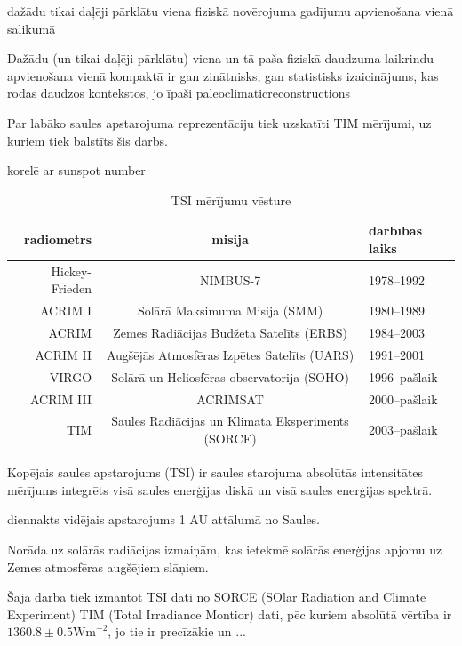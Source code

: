 dažādu tikai daļēji pārklātu viena fiziskā novērojuma 
gadījumu apvienošana vienā salikumā


Dažādu (un tikai daļēji pārklātu) viena un tā paša fiziskā daudzuma laikrindu apvienošana vienā kompaktā ir gan zinātnisks, gan statistisks izaicinājums, kas rodas daudzos kontekstos, jo īpaši paleoclimaticreconstructions



Par labāko saules apstarojuma reprezentāciju tiek uzskatīti TIM mērījumi, uz kuriem tiek balstīts šis darbs.


korelē ar sunspot number



\begin{table}[h]
    \caption{TSI mērījumu vēsture} %
    \begin{center}
    \begin{tabular}{| r | c | l |}
    \hline
    radiometrs & misija & darbības laiks \\ \hline
    Hickey-Frieden & NIMBUS-7 & 1978--1992  \\ \hline
	ACRIM I & Solārā Maksimuma Misija (SMM) & 1980--1989 \\ \hline
	ACRIM  & Zemes Radiācijas Budžeta Satelīts (ERBS) & 1984--2003 \\ \hline
	ACRIM II & Augšējās Atmosfēras Izpētes Satelīts (UARS) & 1991--2001 \\ \hline
	VIRGO & Solārā un Heliosfēras observatorija (SOHO)& 1996--pašlaik \\ \hline
	ACRIM III & ACRIMSAT  & 2000--pašlaik \\ \hline
	TIM & Saules Radiācijas un Klimata Eksperiments (SORCE) & 2003--pašlaik\\ \hline
    \end{tabular}
    \end{center}
    \label{tab:radiometers}
\end{table}


Kopējais saules apstarojums (TSI) ir saules starojuma absolūtās intensitātes mērījums integrēts visā saules enerģijas diskā un visā saules enerģijas spektrā.

diennakts vidējais apstarojums 1 AU attālumā no Saules.

Norāda uz solārās radiācijas izmaiņām, kas ietekmē solārās enerģijas apjomu uz Zemes atmosfēras augšējiem slāņiem.


Šajā darbā tiek izmantot TSI dati no SORCE (SOlar Radiation and Climate Experiment) TIM (Total Irradiance Montior) dati, pēc kuriem absolūtā vērtība ir $1360.8 \pm 0.5 \textrm{Wm}^{-2}$, jo tie ir precīzākie un ...\cite{Frohlich2012}

